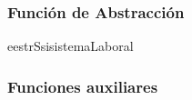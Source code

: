 \subsubsection{Funci\'on de Abstracci\'on}

\begin{FunAbsDescriptiva}{e}{estrS}{si}{sistemaLaboral}


\end{FunAbsDescriptiva}

\subsubsection{Funciones auxiliares}

